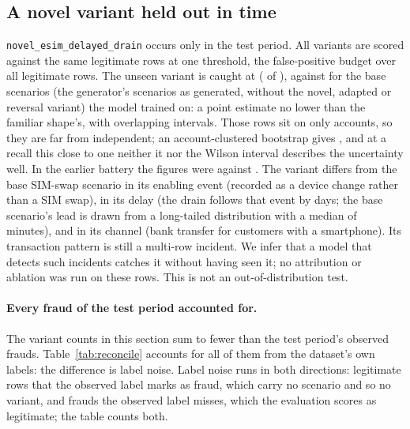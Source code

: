 \subsection{A novel variant held out in time}

\texttt{novel\_esim\_delayed\_drain} occurs only in the test period. All variants are scored
against the same legitimate rows at one threshold, the \nFPRBudget{} false-positive budget over all
legitimate rows. The unseen variant is caught at \nNovelRecall{} \nNovelCI{} (\nNovelCaught{} of
\nNovelRows{}), against \nBaseVarRecall{} \nBaseVarCI{} for the base scenarios (the generator's scenarios as generated,
without the novel, adapted or reversal variant) the model trained
on: a point estimate no lower than the familiar shape's, with overlapping intervals. Those \nNovelRows{} rows sit on only \nNovelAccounts{}
accounts, so they are far from independent; an account-clustered bootstrap gives \nCluNovelci{},
and at a recall this close to one neither it nor the Wilson interval describes the uncertainty well.
In the earlier battery the figures were
\nEarlyNovelRecall{} against \nEarlyBaseRecall{}. The variant differs from the base SIM-swap
scenario in its enabling event (recorded as a device change rather than a SIM swap), in its delay
(the drain follows that event by days; the base scenario's lead is drawn from a long-tailed
distribution with a median of \nLeadMedianMinutes{} minutes), and in its channel (bank transfer for
customers with a smartphone). Its transaction pattern is still a multi-row incident. We infer that a
model that detects such incidents catches it without having seen it; no attribution or ablation was
run on these rows. This is not an out-of-distribution test.

\paragraph{Every fraud of the test period accounted for.} The variant counts in this section sum to
fewer than the test period's \nTestFraud{} observed frauds. Table~\ref{tab:reconcile} accounts for
all of them from the dataset's own labels: the difference is label noise. Label noise runs in both directions: legitimate rows
that the observed label marks as fraud, which carry no scenario and so no variant, and frauds the
observed label misses, which the evaluation scores as legitimate; the table counts both.

